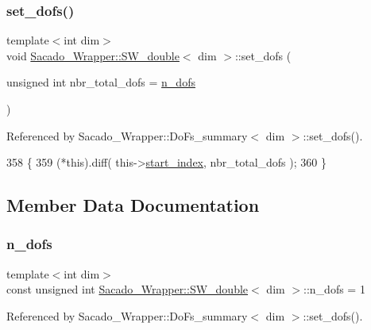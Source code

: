 \subsubsection{\texorpdfstring{set\+\_\+dofs()}{set\_dofs()}}
{\footnotesize\ttfamily template$<$int dim$>$ \\
void \hyperlink{classSacado__Wrapper_1_1SW__double}{Sacado\+\_\+\+Wrapper\+::\+S\+W\+\_\+double}$<$ dim $>$\+::set\+\_\+dofs (\begin{DoxyParamCaption}\item[{unsigned int}]{nbr\+\_\+total\+\_\+dofs = {\ttfamily \hyperlink{classSacado__Wrapper_1_1SW__double_a45e46904e5fd5be42bb4c9bb7454ffc5}{n\+\_\+dofs}} }\end{DoxyParamCaption})}



Referenced by Sacado\+\_\+\+Wrapper\+::\+Do\+Fs\+\_\+summary$<$ dim $>$\+::set\+\_\+dofs().


\begin{DoxyCode}
358     \{
359         (*this).diff( this->\hyperlink{classSacado__Wrapper_1_1SW__double_aa0927ce06528899dd44afe5d770840c1}{start\_index}, nbr\_total\_dofs );
360     \}
\end{DoxyCode}


\subsection{Member Data Documentation}
\mbox{\label{classSacado__Wrapper_1_1SW__double_a45e46904e5fd5be42bb4c9bb7454ffc5}} 
\subsubsection{\texorpdfstring{n\+\_\+dofs}{n\_dofs}}
{\footnotesize\ttfamily template$<$int dim$>$ \\
const unsigned int \hyperlink{classSacado__Wrapper_1_1SW__double}{Sacado\+\_\+\+Wrapper\+::\+S\+W\+\_\+double}$<$ dim $>$\+::n\+\_\+dofs = 1\hspace{0.3cm}{\ttfamily [static]}}



Referenced by Sacado\+\_\+\+Wrapper\+::\+Do\+Fs\+\_\+summary$<$ dim $>$\+::set\+\_\+dofs().

